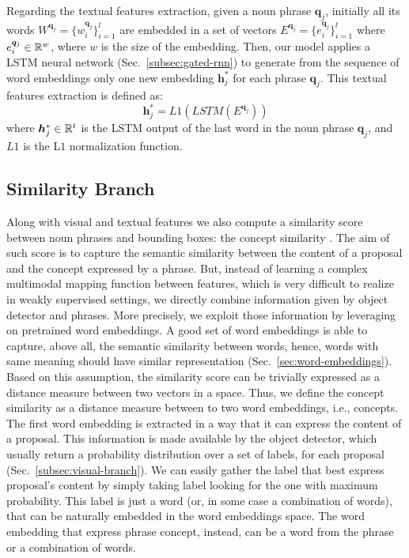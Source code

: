 Regarding the textual features extraction, given a noun phrase
$\bm{q}_j$, initially all its words $W^{\bm{q}_j} = \{ w^{\bm{q}_j}_i
\}^l_{i=1}$ are embedded in a set of vectors $E^{\bm{q}_j} =
\{e^{\bm{q}_j}_i \}^l_{i=1}$ where $e^{\bm{q}_j}_i \in \mathbb{R}^w$, where
$w$ is the size of the embedding. Then, our model applies a LSTM
neural network (Sec.~\ref{subsec:gated-rnn}) to generate from the
sequence of word embeddings only one new embedding $\bm{h}^*_j$ for
each phrase $\bm{q}_j$. This textual features extraction is defined
as:
\begin{equation}
  \bm{h}^*_j = L1(LSTM(E^{\bm{q}_j}))
  \label{eq:h-star}
\end{equation}
where $\bm{h}^*_j \in \mathbb{R}^t$ is the LSTM output of the last word in
the noun phrase $\bm{q}_j$, and $L1$ is the L$1$ normalization
function.

\subsection{Similarity Branch}
\label{subsec:similarity-branch}

Along with visual and textual features we also compute a similarity
score between noun phrases and bounding boxes: the concept similarity
\cite{wang2019phrase}. The aim of such score is to capture the
semantic similarity between the content of a proposal and the concept
expressed by a phrase. But, instead of learning a complex multimodal
mapping function between features, which is very difficult to realize
in weakly supervised settings, we directly combine information given
by object detector and phrases. More precisely, we exploit those
information by leveraging on pretrained word embeddings. A good set of
word embeddings is able to capture, above all, the semantic similarity
between words, hence, words with same meaning should have similar
representation (Sec.~\ref{sec:word-embeddings}). Based on this
assumption, the similarity score can be trivially expressed as a
distance measure between two vectors in a space. Thus, we define the
concept similarity as a distance measure between to two word
embeddings, i.e., concepts. The first word embedding is extracted in a
way that it can express the content of a proposal. This information is
made available by the object detector, which usually return a
probability distribution over a set of labels, for each proposal
(Sec.~\ref{subsec:visual-branch}). We can easily gather the label that
best express proposal's content by simply taking label looking for the
one with maximum probability. This label is just a word (or, in some
case a combination of words), that can be naturally embedded in the
word embeddings space. The word embedding that express phrase concept,
instead, can be a word from the phrase or a combination of words.

